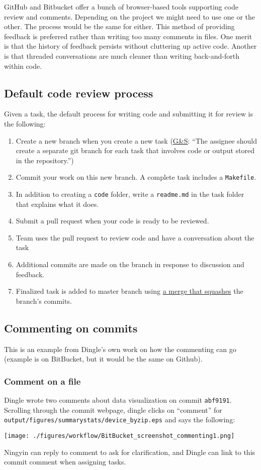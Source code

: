 GitHub and Bitbucket offer a bunch of browser-based tools supporting code review and comments. 
Depending on the project we might need to use one or the other. 
The process would be the same for either. 
This method of providing feedback is preferred rather than writing too many comments in files.
One merit is that the history of feedback persists without cluttering up active code.
Another is that threaded conversations are much cleaner than writing back-and-forth within code.

\subsection{Default code review process}\label{code_review_process}
Given a task, the default process for writing code and submitting it for review is the following:
\begin{enumerate}
\item Create a new branch when you create a new task (\href{https://github.com/gslab-econ/ra-manual/wiki/Tasks}{G\&S}: ``The assignee should create a separate git branch for each task that involves code or output stored in the repository.'')
\item Commit your work on this new branch. A complete task includes a \texttt{Makefile}.
\item In addition to creating a \texttt{code} folder, write a \texttt{readme.md} in the task folder that explains what it does.
\item Submit a pull request when your code is ready to be reviewed.
\item Team uses the pull request to review code and have a conversation about the task
\item Additional commits are made on the branch in response to discussion and feedback.
\item Finalized task is added to master branch using \href{https://bitbucket.org/blog/git-squash-commits-merging-bitbucket}{a merge that squashes} the branch's commits.
\end{enumerate}


\subsection{Commenting on commits}

This is an example from Dingle's own work on how the commenting can go (example is on BitBucket, but it would be the same on Github).
\subsubsection{Comment on a file}
Dingle wrote two comments about data visualization on commit \texttt{abf9191}.
Scrolling through the commit webpage, dingle clicks on ``comment'' for \texttt{output/figures/summarystats/device\_byzip.eps} and says the following:
\begin{center}\texttt{[image: ./figures/workflow/BitBucket\_screenshot\_commenting1.png]}\end{center}
Ningyin can reply to comment to ask for clarification, and Dingle can link to this commit comment when assigning tasks.

